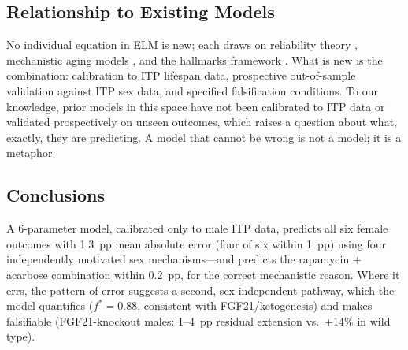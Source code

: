 \documentclass[11pt]{article}
\begin{document}
\subsection{Relationship to Existing Models}

No individual equation in ELM is new; each draws on reliability theory \citep{Gavrilov2001}, mechanistic aging models \citep{Kowald1993,Kogan2015,Podolskiy2015}, and the hallmarks framework \citep{LopezOtin2013,LopezOtin2023}. What is new is the combination: calibration to ITP lifespan data, prospective out-of-sample validation against ITP sex data, and specified falsification conditions. To our knowledge, prior models in this space have not been calibrated to ITP data or validated prospectively on unseen outcomes, which raises a question about what, exactly, they are predicting. A model that cannot be wrong is not a model; it is a metaphor.

\subsection{Conclusions}

A 6-parameter model, calibrated only to male ITP data, predicts all six female outcomes with 1.3~pp mean absolute error (four of six within 1~pp) using four independently motivated sex mechanisms---and predicts the rapamycin + acarbose combination within 0.2~pp, for the correct mechanistic reason. Where it errs, the pattern of error suggests a second, sex-independent pathway, which the model quantifies ($f^* = 0.88$, consistent with FGF21/ketogenesis) and makes falsifiable (FGF21-knockout males: 1--4~pp residual extension vs.\ +14\% in wild type).




\end{document}
